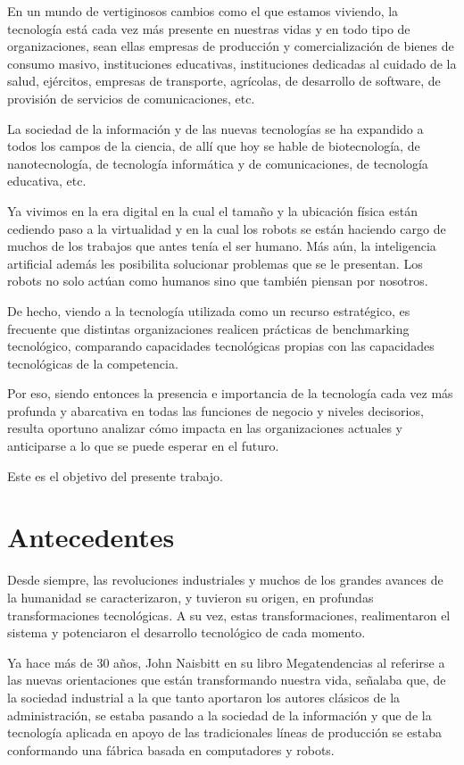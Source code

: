 \documentclass[a4paper, 12pt]{article}
\begin{document}
En un mundo de vertiginosos cambios como el que estamos viviendo, la tecnología está cada vez más presente en nuestras vidas y en todo tipo de organizaciones, sean ellas empresas de producción y comercialización de bienes de consumo masivo, instituciones educativas, instituciones dedicadas al cuidado de la salud, ejércitos, empresas de transporte, agrícolas, de desarrollo de software, de provisión de servicios de comunicaciones, etc.

La sociedad de la información y de las nuevas tecnologías se ha expandido a todos los campos de la ciencia, de allí que hoy se hable de biotecnología, de nanotecnología, de tecnología informática y de comunicaciones, de tecnología educativa, etc.

Ya vivimos en la era digital en la cual el tamaño y la ubicación física están cediendo paso a la virtualidad y en la cual los robots se están haciendo cargo de muchos de los trabajos que antes tenía el ser humano. Más aún, la inteligencia artificial además les posibilita solucionar problemas que se le presentan. Los robots no solo actúan como humanos sino que también piensan por nosotros.

De hecho, viendo a la tecnología utilizada como un recurso estratégico, es frecuente que distintas organizaciones realicen prácticas de benchmarking tecnológico, comparando capacidades tecnológicas propias con las capacidades tecnológicas de la competencia.

Por eso, siendo entonces la presencia e importancia de la tecnología cada vez más profunda y abarcativa en todas las funciones de negocio y niveles decisorios, resulta oportuno analizar cómo impacta en las organizaciones actuales y anticiparse a lo que se puede esperar en el futuro.

Este es el objetivo del presente trabajo.

\section{Antecedentes}
\label{sec:Antecedentes}
Desde siempre, las revoluciones industriales y muchos de los grandes avances de la humanidad se caracterizaron, y tuvieron su origen, en profundas transformaciones tecnológicas. A su vez, estas transformaciones, realimentaron el sistema y potenciaron el desarrollo tecnológico de cada momento.

Ya hace más de 30 años, John Naisbitt en su libro Megatendencias \cite{Naisbitt1984} al referirse a las nuevas orientaciones que están transformando nuestra vida, señalaba que, de la sociedad industrial a la que tanto aportaron los autores clásicos de la administración, se estaba pasando a la sociedad de la información y que de la tecnología aplicada en apoyo de las tradicionales líneas de producción se estaba conformando una fábrica basada en computadores y robots.
\end{document}
